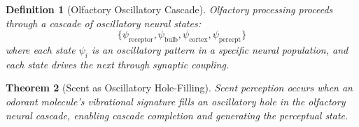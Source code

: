 \documentclass[11pt]{article}
\newtheorem{theorem}{Theorem}[section]
\newtheorem{definition}[theorem]{Definition}
\theoremstyle{remark}
\begin{document}
\begin{definition}[Olfactory Oscillatory Cascade]
\label{def:olfactory_cascade}
Olfactory processing proceeds through a cascade of oscillatory neural states:
\begin{equation}
\{\psi_{\text{receptor}}, \psi_{\text{bulb}}, \psi_{\text{cortex}}, \psi_{\text{percept}}\}
\end{equation}
where each state $\psi_i$ is an oscillatory pattern in a specific neural population, and each state drives the next through synaptic coupling.
\end{definition}

\begin{theorem}[Scent as Oscillatory Hole-Filling]
\label{thm:scent_hole_filling}
Scent perception occurs when an odorant molecule's vibrational signature fills an oscillatory hole in the olfactory neural cascade, enabling cascade completion and generating the perceptual state.
\end{theorem}
\end{document}
